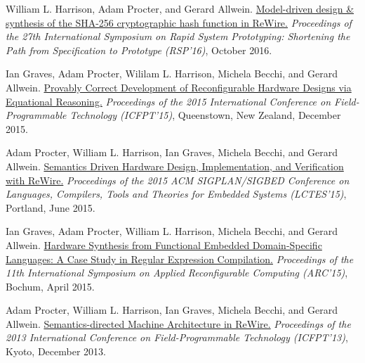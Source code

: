 \documentclass[10pt]{article}
\makeatletter
\newlength{\bibhang}
\newlength{\bibsep}
 {\@listi \global\bibsep\itemsep \global\advance\bibsep by\parsep}
\newenvironment{bibsection}
    {\minipage[t]{\linewidth}\list{}{%
        \setlength{\leftmargin}{\bibhang}%
        \setlength{\itemindent}{-\leftmargin}%
        \setlength{\itemsep}{\bibsep}%
        \setlength{\parsep}{\z@}%
        }}
    {\endlist\endminipage}
\makeatother
\begin{document}
\begin{bibsection}
    \item William L. Harrison, Adam Procter, and Gerard Allwein. \ul{Model-driven design \& synthesis of the SHA-256 cryptographic hash function in ReWire.}
        \emph{Proceedings of the 27th International Symposium on Rapid System Prototyping: Shortening the Path from Specification to Prototype (RSP'16)}, October 2016.

    \item Ian Graves, Adam Procter, Wililam L. Harrison, Michela Becchi, and Gerard Allwein. \ul{Provably Correct Development of Reconfigurable Hardware Designs via Equational Reasoning.}
	\emph{Proceedings of the 2015 International Conference on Field-Programmable Technology (ICFPT'15)}, Queenstown, New Zealand, December 2015.

    \item Adam Procter, William L. Harrison, Ian Graves, Michela Becchi, and Gerard Allwein. \ul{Semantics Driven Hardware Design, Implementation, and Verification with ReWire.}
        \emph{Proceedings of the 2015 ACM SIGPLAN/SIGBED Conference on Languages, Compilers, Tools and Theories for Embedded Systems (LCTES'15)}, Portland, June 2015.

    \item Ian Graves, Adam Procter, William L. Harrison, Michela Becchi, and Gerard Allwein. \ul{Hardware Synthesis from Functional Embedded Domain-Specific Languages: A Case Study in Regular Expression Compilation.}
        \emph{Proceedings of the 11th International Symposium on Applied Reconfigurable Computing (ARC'15)}, Bochum, April 2015.

    \item Adam Procter, William L. Harrison, Ian Graves, Michela Becchi, and Gerard Allwein. \ul{Semantics-directed Machine Architecture in ReWire.}
        \emph{Proceedings of the 2013 International Conference on Field-Programmable Technology (ICFPT'13)}, Kyoto, December 2013.

\end{bibsection}
\end{document}
